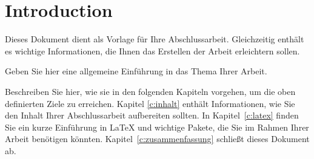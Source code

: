 \chapter{Introduction}
\label{c:introduction}


Dieses Dokument dient als Vorlage für Ihre Abschlussarbeit.
Gleichzeitig enthält es wichtige Informationen, die Ihnen das
Erstellen der Arbeit erleichtern sollen.

Geben Sie hier eine allgemeine Einführung in das Thema Ihrer Arbeit.

Beschreiben Sie hier, wie sie in den folgenden Kapiteln
  vorgehen, um die oben definierten Ziele zu erreichen.
Kapitel \ref{c:inhalt} enthält Informationen, wie Sie den Inhalt
Ihrer Abschlussarbeit aufbereiten sollten.
In Kapitel~\ref{c:latex} finden Sie ein kurze Einführung in \LaTeX
und wichtige Pakete, die Sie im Rahmen Ihrer Arbeit benötigen
könnten.
Kapitel~\ref{c:zusammenfassung} schließt dieses Dokument ab.



